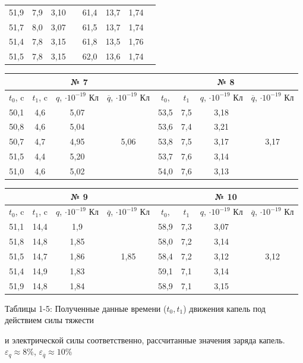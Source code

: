 \documentclass[a4paper, 12pt]{article}%
\begin{document}
\begin{enumerate}
\begin{longtable} {|c|c|c|c|c|c|c|c|}
	51,9 & 7,9 & 3,10 &  & 61,4 & 13,7 & 1,74 &  \\ \hhline{---~---~}
	51,7 & 8,0 & 3,07 &  & 61,5 & 13,7 & 1,74 &  \\ \hhline{---~---~}
	51,4 & 7,8 & 3,15 &  & 61,8 & 13,5 & 1,76 &  \\ \hhline{---~---~}
	51,5 & 7,8 & 3,15 &  & 62,0 & 13,6 & 1,74 &  \\ \hline
\end{longtable}
\begin{longtable} {|c|c|c|c|c|c|c|c|}
	\hline
	\multicolumn{4}{|c|}{№ 7} & \multicolumn{4}{c|}{№ 8} \\ \hline
	$t_0$, c& $t_1$, c & $q$, $\cdot 10^{-19}$ Кл & $\overline{q}$, $\cdot 10^{-19}$ Кл & 	$t_0$, & $t_1$ & $q$, $\cdot 10^{-19}$ Кл & $\overline{q}$, $\cdot 10^{-19}$ Кл\\ \hline
	50,1 & 4,6 & 5,07 & \multirow{5}{*}{5,06} & 53,5 & 7,5 & 3,18 & \multirow{5}{*}{3,17} \\ \hhline{---~---~}
	50,8 & 4,6 & 5,04 &  & 53,6 & 7,4 & 3,21 &  \\ \hhline{---~---~}
	50,7 & 4,7 & 4,95 &  & 53,8 & 7,5 & 3,17 &  \\ \hhline{---~---~}
	51,5 & 4,4 & 5,20 &  & 53,7 & 7,6 & 3,14 &  \\ \hhline{---~---~}
	51,0 & 4,6 & 5,02 &  & 54,0 & 7,6 & 3,13 &  \\ \hline
\end{longtable}
\begin{longtable} {|c|c|c|c|c|c|c|c|}
	\hline
	\multicolumn{4}{|c|}{№ 9} & \multicolumn{4}{c|}{№ 10} \\ \hline
	$t_0$, c& $t_1$, c & $q$, $\cdot 10^{-19}$ Кл & $\overline{q}$, $\cdot 10^{-19}$ Кл & 	$t_0$, & $t_1$ & $q$, $\cdot 10^{-19}$ Кл & $\overline{q}$, $\cdot 10^{-19}$ Кл\\ \hline
	51,1 & 14,4 & 1,9 & \multirow{5}{*}{1,85} & 58,9 & 7,3 & 3,07 & \multirow{5}{*}{3,12} \\ \hhline{---~---~}
	51,8 & 14,8 & 1,85 &  & 58,0 & 7,2 & 3,14 &  \\ \hhline{---~---~}
	51,5 & 14,7 & 1,86 &  & 58,4 & 7,2 & 3,12 &  \\ \hhline{---~---~}
	51,4 & 14,9 & 1,83 &  & 59,1 & 7,1 & 3,14 &  \\ \hhline{---~---~}
	51,9 & 14,8 & 1,84 &  & 58,9 & 7,1 & 3,15 &  \\ \hline
\end{longtable}
\centerline{Таблицы 1-5: Полученные данные времени ($t_0, t_1$) движения капель под действием силы тяжести}
\centerline{и электрической силы соответственно, рассчитанные значения заряда капель. $\varepsilon_q \approx 8\%$, $\varepsilon_{\overline{q}} \approx 10\%$}
	

\end{enumerate}
\end{document}
